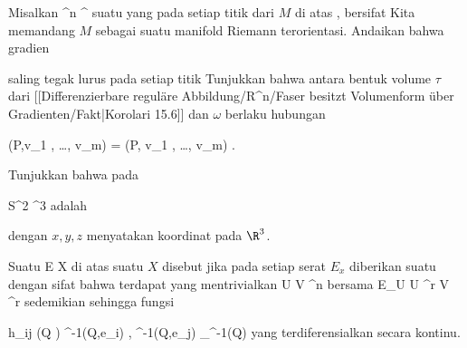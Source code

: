 {}
{

Misalkan
\maabbdisp {\varphi} {\R^n } {\R^\ell
} {}
 {} {}
suatu
yang pada setiap titik dari
$M$ di atas
\mathl{0 \in \R^\ell}{}, bersifat
Kita memandang $M$ sebagai suatu manifold Riemann terorientasi. Andaikan bahwa gradien

 {  }

saling tegak lurus pada setiap titik
 Tunjukkan bahwa antara bentuk volume $\tau$ dari
[[Differenzierbare reguläre Abbildung/R^n/Faser besitzt Volumenform über Gradienten/Fakt|Korolari 15.6]]
dan
$\omega$ berlaku hubungan

\mavergleichskettedisp
{\vergleichskette
{\tau(P,v_1 , \ldots , v_m)
}
{ =} { \pm {} \Vert  \cdots {} \Vert \omega(P, v_1 , \ldots , v_m)
}
{ } {
}
{ } {
}
{ } {
}
}
{}{}{.}

}
{} {}

{}
{

Tunjukkan bahwa
pada

\mavergleichskette
{\vergleichskette
{S^2
}
{ \subset }{ \R^3
}
{  }{
}
{    }{
}
{   }{
}
}
{}{}{}
adalah

 {  }

dengan $x,y,z$ menyatakan koordinat pada $\R^3$.

}
{} {}

Suatu
 { E } { X
} {}
di atas suatu
$X$ disebut
jika pada setiap serat $E_x$ diberikan suatu
dengan sifat bahwa terdapat
yang mentrivialkan
\maabbdisp {\alpha} { U } { V \subseteq \R^n
} {}
bersama
\maabbdisp {\theta} {E\vert_U \cong U \times \R^r } { V \times \R^r
} {}
sedemikian sehingga fungsi

\mavergleichskettedisp
{\vergleichskette
{ h_{ij} (Q )
}
{ } { \left\langle  \theta^{-1}(Q,e_i)  , \theta^{-1}(Q,e_j)    \right\rangle_{\alpha^{-1}(Q)}
}
{ } {
}
{ } {
}
{ } {
}
}
{}{}{}
yang terdiferensialkan secara kontinu.

